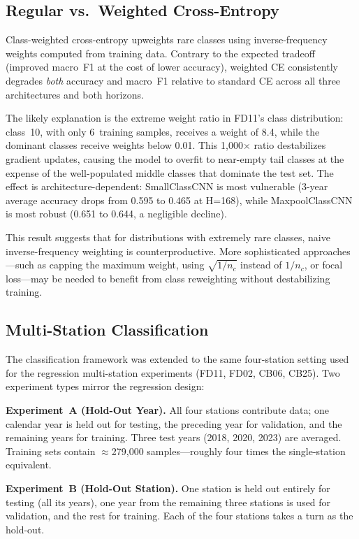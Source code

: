 \documentclass[11pt]{article}
\begin{document}
\subsection{Regular vs.\ Weighted Cross-Entropy}

Class-weighted cross-entropy upweights rare classes using inverse-frequency weights
computed from training data. Contrary to the expected tradeoff (improved macro~F1
at the cost of lower accuracy), weighted CE consistently degrades \emph{both}
accuracy and macro~F1 relative to standard CE across all three architectures and
both horizons.

The likely explanation is the extreme weight ratio in FD11's class distribution:
class~10, with only 6~training samples, receives a weight of 8.4, while the
dominant classes receive weights below 0.01. This 1{,}000$\times$ ratio
destabilizes gradient updates, causing the model to overfit to near-empty tail
classes at the expense of the well-populated middle classes that dominate the test
set. The effect is architecture-dependent: SmallClassCNN is most vulnerable
(3-year average accuracy drops from 0.595 to 0.465 at H=168), while MaxpoolClassCNN
is most robust (0.651 to 0.644, a negligible decline).

This result suggests that for distributions with extremely rare classes, naive
inverse-frequency weighting is counterproductive. More sophisticated approaches---such
as capping the maximum weight, using $\sqrt{1/n_c}$ instead of $1/n_c$, or focal
loss---may be needed to benefit from class reweighting without destabilizing training.

\subsection{Multi-Station Classification}

The classification framework was extended to the same four-station setting used for
the regression multi-station experiments (FD11, FD02, CB06, CB25). Two experiment
types mirror the regression design:

\textbf{Experiment~A (Hold-Out Year).} All four stations contribute data; one
calendar year is held out for testing, the preceding year for validation, and the
remaining years for training. Three test years (2018, 2020, 2023) are averaged.
Training sets contain $\approx$279{,}000 samples---roughly four times the
single-station equivalent.

\textbf{Experiment~B (Hold-Out Station).} One station is held out entirely for
testing (all its years), one year from the remaining three stations is used for
validation, and the rest for training. Each of the four stations takes a turn as
the hold-out.
\end{document}
